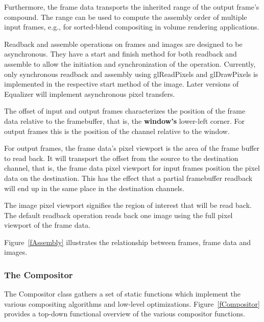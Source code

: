\documentclass[10pt,a4]{scrartcl}
\newcommand{\fig}[1]{Figure~\ref{#1}}
\begin{document}
Furthermore, the frame data transports the inherited range of the output
frame's compound. The range can be used to compute the assembly order of
multiple input frames, e.g., for sorted-blend compositing in volume
rendering applications.

Readback and assemble operations on frames and images are designed to be
asynchronous. They have a start and finish method for both readback and
assemble to allow the initiation and synchronization of the operation.
Currently, only synchronous readback and assembly using
\textsf{glReadPixels} and \textsf{glDrawPixels} is implemented in the
respective start method of the image. Later versions of Equalizer will
implement asynchronous pixel transfers.

The offset of input and output frames characterizes the position of the
frame data relative to the framebuffer, that is, the \textbf{window's}
lower-left corner. For output frames this is the position of the channel
relative to the window.

For output frames, the frame data's pixel viewport is the area of the
frame buffer to read back. It will transport the offset from the source
to the destination channel, that is, the frame data pixel viewport for
input frames position the pixel data on the destination. This has the
effect that a partial framebuffer readback will end up in the same place
in the destination channels.

The image pixel viewport signifies the region of interest that will be read
back. The default readback operation reads back one image using the full
pixel viewport of the frame data.

\fig{fAssembly} illustrates the relationship between frames, frame data
and images.

\subsubsection{\label{sCompositor}The Compositor}

The \textsf{Compositor} class gathers a set of static functions which
implement the various compositing algorithms and low-level
optimizations. \fig{fCompositor} provides a top-down functional overview
of the various compositor functions.
\end{document}

